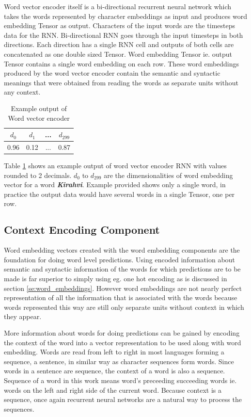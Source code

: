 \documentclass[12pt,a4paper,english
]{tutthesis}
\begin{document}
Word vector encoder itself is a bi-directional recurrent neural network which takes the words represented by character embeddings as input and produces word embedding Tensor as output. Characters of the input words are the timesteps data for the RNN. Bi-directional RNN goes through the input timesteps in both directions. Each direction has a single RNN cell and outputs of both cells are concatenated as one double sized Tensor. Word embedding Tensor ie. output Tensor contains a single word embedding on each row. These word embeddings produced by the word vector encoder contain the semantic and syntactic meanings that were obtained from reading the words as separate units without any context.

\begin{table}[htbp]
\caption{Example output of Word vector encoder}
\label{table:word_vector_encoder_output}
\centering
\begin{tabular}{|c|c|c|c|}
  \hline
  $d_0$ & $d_1$ & ... & $d_{299}$ \\
  \hline
  \hline
  0.96 & 0.12 & ... & 0.87 \\
  \hline
\end{tabular}
\end{table}

Table \ref{table:word_vector_encoder_output} shows an example output of word vector encoder RNN with values rounded to 2 decimals. $d_0$ to $d_{299}$ are the dimensionalities of word embedding vector for a word \textbf{\textit{Kirahvi}}. Example provided shows only a single word, in practice the output data would have several words in a single Tensor, one per row.


\subsection{Context Encoding Component}
\label{ss:context_encoding_component}
Word embedding vectors created with the word embedding components are the foundation for doing word level predictions. Using encoded information about semantic and syntactic information of the words for which predictions are to be made is far superior to simply using eg. one hot encoding as is discussed in section \ref{se:word_embeddings}. However word embeddings are not nearly perfect representation of all the information that is associated with the words because words represented this way are still only separate units without context in which they appear.

More information about words for doing predictions can be gained by encoding the context of the word into a vector representation to be used along with word embedding. Words are read from left to right in most languages forming a sequence, a sentence, in similar way as character sequences form words. Since words in a sentence are sequence, the context of a word is also a sequence. Sequence of a word in this work means word's preceeding succeeding words ie. words on the left and right side of the current word. Because context is a sequence, once again recurrent neural networks are a natural way to process the sequences.
\end{document}
